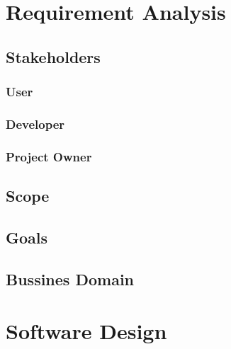 \documentclass{article}
\begin{document}
        \pagebreak

\section{Requirement Analysis}
    
        \subsection{Stakeholders}
        

            \subsubsection{User}
            
            
            \subsubsection{Developer}
            
            
            \subsubsection{Project Owner}
            
    
        \subsection{Scope}
        
    
        \subsection{Goals}
        

        \subsection{Bussines Domain}
        

        \pagebreak

\section{Software Design}
\end{document}
